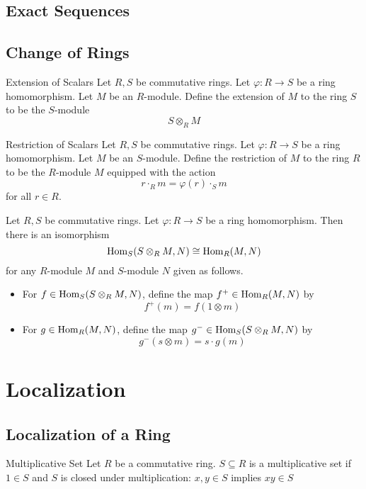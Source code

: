 \documentclass[a4paper]{article}
\begin{document}
\subsection{Exact Sequences}

\subsection{Change of Rings}
\begin{defn}{Extension of Scalars}{} Let $R,S$ be commutative rings. Let $\varphi:R\to S$ be a ring homomorphism. Let $M$ be an $R$-module. Define the extension of $M$ to the ring $S$ to be the $S$-module $$S\otimes_R M$$
\end{defn}

\begin{defn}{Restriction of Scalars}{} Let $R,S$ be commutative rings. Let $\varphi:R\to S$ be a ring homomorphism. Let $M$ be an $S$-module. Define the restriction of $M$ to the ring $R$ to be the $R$-module $M$ equipped with the action $$r\cdot_R m=\varphi(r)\cdot_S m$$ for all $r\in R$. 
\end{defn}

\begin{thm}{}{} Let $R,S$ be commutative rings. Let $\varphi:R\to S$ be a ring homomorphism. Then there is an isomorphism $$\operatorname{Hom}_S(S\otimes_R M,N)\cong\operatorname{Hom}_R(M,N)$$ for any $R$-module $M$ and $S$-module $N$ given as follows. 
\begin{itemize}
\item For $f\in\operatorname{Hom}_S(S\otimes_R M,N)$, define the map $f^+\in\operatorname{Hom}_R(M,N)$ by $$f^+(m)=f(1\otimes m)$$
\item For $g\in\operatorname{Hom}_R(M,N)$, define the map $g^-\in\operatorname{Hom}_S(S\otimes_RM,N)$ by $$g^-(s\otimes m)=s\cdot g(m)$$
\end{itemize}
\end{thm}

\pagebreak
\section{Localization}
\subsection{Localization of a Ring}
\begin{defn}{Multiplicative Set}{} Let $R$ be a commutative ring. $S\subseteq R$ is a multiplicative set if $1\in S$ and $S$ is closed under multiplication: $x,y\in S$ implies $xy\in S$
\end{defn}
\end{document}
